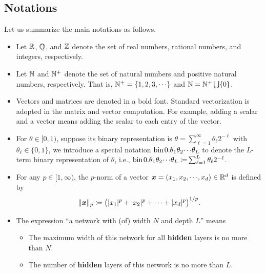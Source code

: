 \documentclass[nohyperref]{article}
\theoremstyle{plain}
\theoremstyle{definition}
\theoremstyle{remark}
\begin{document}
\subsection{Notations}
Let us summarize the main notations as follows.
\begin{itemize}	  
	\item Let $\R$, $\Q$, and $\Z$ denote the set of real numbers, rational numbers, and integers, respectively.
	
	\item Let $\N$ and $\N^+$ denote the set of natural numbers and positive natural numbers, respectively.  That is,
	$\N^+=\{1,2,3,\cdots\}$ and $\N=\N^+\bigcup\{0\}$.
	
	\item Vectors and matrices are denoted in a bold font. Standard vectorization is adopted in the matrix and vector computation. For example, adding a scalar and a vector means adding the scalar to each entry of the vector.
	
	\item For $\theta\in[0,1)$, suppose its binary representation is $\theta=\sum_{\ell=1}^{\infty}\theta_\ell2^{-\ell}$ with $\theta_\ell\in \{0,1\}$, we introduce a special notation $\bin 0.\theta_1\theta_2\cdots \theta_L$ to denote the $L$-term binary representation of $\theta$, i.e., ${\bin 0.\theta_1\theta_2\cdots \theta_L\coloneqq}\sum_{\ell=1}^{L}\theta_\ell2^{-\ell}$. 
	
	\item For any $p\in [1,\infty)$, the $p$-norm of a vector $\bmx=(x_1,x_2,\cdots,x_d)\in\R^d$ is defined by 
	\begin{equation*}
		\|\bmx\|_p\coloneqq \big(|x_1|^p+|x_2|^p+\cdots+|x_d|^p\big)^{1/p}.
	\end{equation*}
	
	\item The expression ``a network with (of) width $N$ and depth $L$'' means
	\begin{itemize}
		\item The maximum width of this network for all \textbf{hidden} layers  is no more than $N$.
		\item The number of \textbf{hidden} layers of this network is  no more than $L$.
	\end{itemize}
	

\end{itemize}
\end{document}

